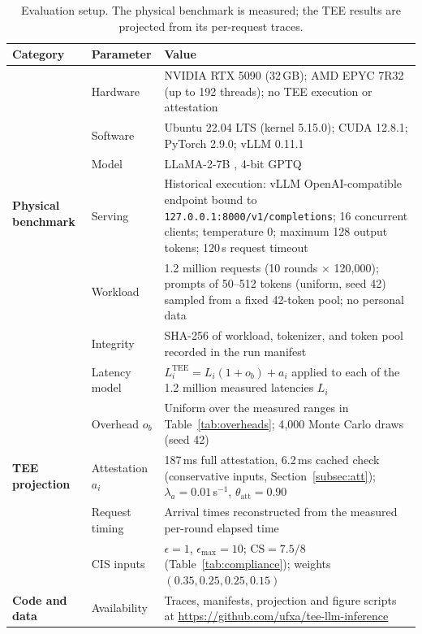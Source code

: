 \documentclass{ieeeaccess}
\begin{document}
\begin{table}[t]
\caption{Evaluation setup. The physical benchmark is measured; the TEE
results are projected from its per-request traces.}
\label{tab:setup}
\begin{tabularx}{\textwidth}{l l X}
\toprule
\textbf{Category} & \textbf{Parameter} & \textbf{Value} \\
\midrule
\multirow{6}{*}{\textbf{Physical benchmark}} &
  Hardware  & NVIDIA RTX 5090 (32\,GB); AMD EPYC 7R32 (up to 192 threads); no TEE execution or attestation \\
& Software  & Ubuntu 22.04 LTS (kernel 5.15.0); CUDA 12.8.1; PyTorch 2.9.0; vLLM 0.11.1 \cite{kwon2023efficient} \\
& Model     & LLaMA-2-7B \cite{touvron2023llama}, 4-bit GPTQ \cite{frantar2022gptq} \\
& Serving   & Historical execution: vLLM OpenAI-compatible endpoint bound to \texttt{127.0.0.1:8000/v1/completions}; 16 concurrent clients; temperature 0; maximum 128 output tokens; 120\,s request timeout \\
& Workload  & 1.2 million requests (10 rounds $\times$ 120{,}000); prompts of 50--512 tokens (uniform, seed 42) sampled from a fixed 42-token pool; no personal data \\
& Integrity & SHA-256 of workload, tokenizer, and token pool recorded in the run manifest \\
\midrule
\multirow{5}{*}{\textbf{TEE projection}} &
  Latency model & $L^{\mathrm{TEE}}_i = L_i(1+o_b) + a_i$ applied to each of the 1.2 million measured latencies $L_i$ \\
& Overhead $o_b$ & Uniform over the measured ranges in Table~\ref{tab:overheads}; 4{,}000 Monte Carlo draws (seed 42) \\
& Attestation $a_i$ & 187\,ms full attestation, 6.2\,ms cached check (conservative inputs, Section~\ref{subsec:att}); $\lambda_a = 0.01$\,s$^{-1}$, $\theta_{\text{att}} = 0.90$ \\
& Request timing & Arrival times reconstructed from the measured per-round elapsed time \\
& CIS inputs & $\epsilon = 1$, $\epsilon_{\max} = 10$; $\mathrm{CS} = 7.5/8$ (Table~\ref{tab:compliance}); weights $(0.35, 0.25, 0.25, 0.15)$ \\
\midrule
\textbf{Code and data} & Availability & Traces, manifests, projection and figure scripts at \url{https://github.com/ufxa/tee-llm-inference} \\
\bottomrule
\end{tabularx}
\end{table}
\end{document}
